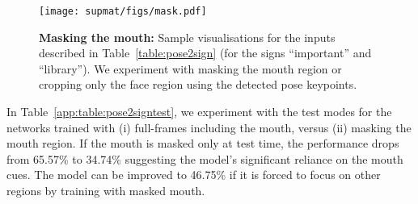 \begin{figure}[t]
    \centering
    \texttt{[image: supmat/figs/mask.pdf]}
    \caption{\textbf{Masking the mouth:} Sample visualisations for the inputs
    described in
    Table~\ref{table:pose2sign}
(for the signs ``important'' and ``library''). We experiment with masking the mouth
    region or cropping only the face region using the detected pose keypoints.
    }
    \label{app:fig:mask}
\end{figure}
In Table~\ref{app:table:pose2signtest},
we experiment with the test modes for the networks trained with
(i) full-frames including the mouth, versus
(ii) masking the mouth region.
If the mouth is masked only
at test time, the performance drops from 65.57\% to 34.74\%
suggesting the model's significant reliance on the mouth cues.
The model can be improved to 46.75\% if it is forced to
focus on other regions by training with masked mouth.

\begin{table}[t]
    \centering
    \caption{We complement
        Table~\ref{table:pose2sign}
by investigating different test modes for I3D, when trained with
        or without the mouth pixels. The model trained with full-frames
        relies significantly on the mouth, whose performance drops from 65.57\%
        to 34.74\% when the mouth is masked. The models are trained on
        the subset of \datasetName{} where pose estimates are available.
    }
    \label{app:table:pose2signtest}
\end{table}


